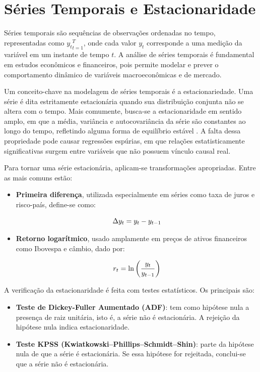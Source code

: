 \documentclass[	12pt, Times, openright, oneside, a4paper, english, brazil]{abntex2}
\begin{document}
\section{Séries Temporais e Estacionaridade}

Séries temporais são sequências de observações ordenadas no tempo, representadas como ${y_t}_{t=1}^{T}$, onde cada valor $y_t$ corresponde a uma medição da variável em um instante de tempo $t$. A análise de séries temporais é fundamental em estudos econômicos e financeiros, pois permite modelar e prever o comportamento dinâmico de variáveis macroeconômicas e de mercado.

Um conceito-chave na modelagem de séries temporais é a estacionariedade. Uma série é dita estritamente estacionária quando sua distribuição conjunta não se altera com o tempo. Mais comumente, busca-se a estacionaridade em sentido amplo, em que a média, variância e autocovariância da série são constantes ao longo do tempo, refletindo alguma forma de equilíbrio
estável \cite{Bezerra2006}. A falta dessa propriedade pode causar regressões espúrias, em que relações estatisticamente significativas surgem entre variáveis que não possuem vínculo causal real.

Para tornar uma série estacionária, aplicam-se transformações apropriadas. Entre as mais comuns estão:

\begin{itemize}
\item \textbf{Primeira diferença}, utilizada especialmente em séries como taxa de juros e risco-país, define-se como:

\begin{equation}\hfill
\Delta y_t = y_t - y_{t-1}
\label{eq:diff}
\end{equation}

\item \textbf{Retorno logarítmico}, usado amplamente em preços de ativos financeiros como Ibovespa e câmbio, dado por:

\begin{equation}\hfill
r_t = \ln\left(\frac{y_t}{y_{t-1}}\right)
\label{eq:logreturn}
\end{equation}
\end{itemize}

A verificação da estacionaridade é feita com testes estatísticos. Os principais são:

\begin{itemize}
\item \textbf{Teste de Dickey-Fuller Aumentado (ADF)}: tem como hipótese nula a presença de raiz unitária, isto é, a série não é estacionária. A rejeição da hipótese nula indica estacionaridade.
\item \textbf{Teste KPSS (Kwiatkowski–Phillips–Schmidt–Shin)}: parte da hipótese nula de que a série é estacionária. Se essa hipótese for rejeitada, conclui-se que a série não é estacionária.
\end{itemize}
\end{document}
